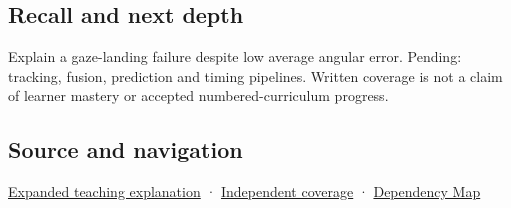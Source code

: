 \subsection{Recall and next depth}\label{appendix-a6f2c4fe1996-recall-and-next-depth}

Explain a gaze-landing failure despite low average angular error. Pending: tracking, fusion, prediction and timing pipelines. Written coverage is not a claim of learner mastery or accepted numbered-curriculum progress.

\subsection{Source and navigation}\label{appendix-a6f2c4fe1996-source-and-navigation}

\hyperref[04-visual-computing-ii-ch042-a-gaze-sample-needs-a-time-as-well-as-a-direction]{Expanded teaching explanation} · \hyperref[appendix-fd090d982a15-xr01---independent-seeing-and-representation-source]{Independent coverage} · \hyperref[appendix-4ad47bdd269a]{Dependency Map}
